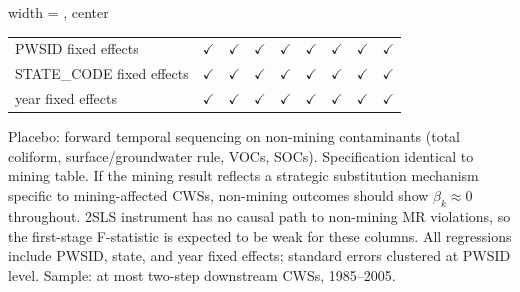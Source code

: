 \begin{table}[htbp]
\begin{adjustbox}{width = \textwidth, center}
\begin{tabular}{lcccccccc}
          \\
         
         PWSID fixed effects                      & $\checkmark$  & $\checkmark$  & $\checkmark$  & $\checkmark$          & $\checkmark$  & $\checkmark$  & $\checkmark$  & $\checkmark$\\   
         STATE\_CODE fixed effects                & $\checkmark$  & $\checkmark$  & $\checkmark$  & $\checkmark$          & $\checkmark$  & $\checkmark$  & $\checkmark$  & $\checkmark$\\   
         year fixed effects                       & $\checkmark$  & $\checkmark$  & $\checkmark$  & $\checkmark$          & $\checkmark$  & $\checkmark$  & $\checkmark$  & $\checkmark$\\   
         
         \bottomrule
         
      \end{tabular}
      
      
      
   \end{adjustbox}
      {\tiny\linespread{1}\selectfont \par \raggedright 
   Placebo: forward temporal sequencing on non-mining contaminants (total coliform, surface/groundwater rule, VOCs, SOCs). Specification identical to mining table. If the mining result reflects a strategic substitution mechanism specific to mining-affected CWSs, non-mining outcomes should show $\hat{\beta}_k \approx 0$ throughout. 2SLS instrument has no causal path to non-mining MR violations, so the first-stage F-statistic is expected to be weak for these columns. All regressions include PWSID, state, and year fixed effects; standard errors clustered at PWSID level. Sample: at most two-step downstream CWSs, 1985--2005.}
   
\end{table}


